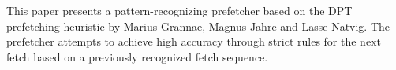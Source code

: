 This paper presents a pattern-recognizing prefetcher based on the DPT prefetching heuristic by Marius Grannae, Magnus Jahre and Lasse Natvig. The prefetcher attempts to achieve high accuracy through strict rules for the next fetch based on a previously recognized fetch sequence.